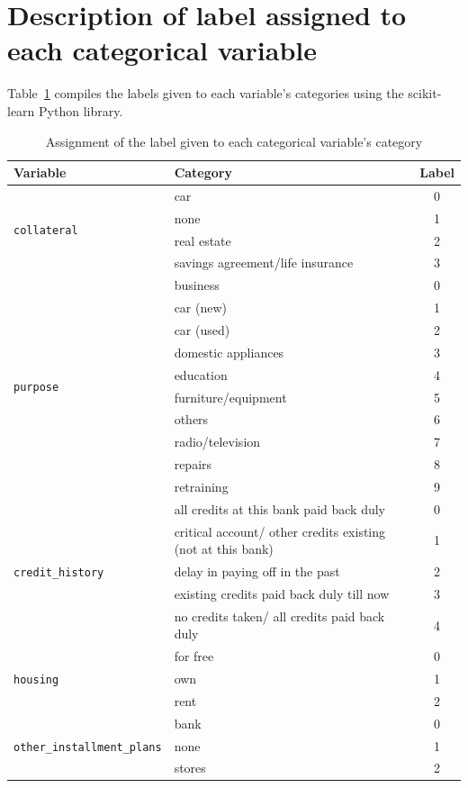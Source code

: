 \documentclass{ieeeaccess}
\begin{document}
\section{Description of label assigned to each categorical variable}
\label{ap:label_categorical}

Table~\ref{tab:label_categorical} compiles the labels given to each variable's categories using the scikit-learn Python library.

\begin{table}[!t]
  \caption{Assignment of the label given to each categorical variable's category}
  \label{tab:label_categorical}
  \centering
  \begin{tabular}{llc}
    \toprule
    Variable & Category & Label \\
    \midrule
    \multirow{4}{*}{\texttt{collateral}}
    & car & 0 \\
    & none & 1 \\
    & real estate & 2 \\
    & savings agreement/life insurance & 3 \\
    \midrule
    \multirow{10}{*}{\texttt{purpose}}
    & business & 0 \\
    & car (new) & 1 \\
    & car (used) & 2 \\
    & domestic appliances & 3 \\
    & education & 4 \\
    & furniture/equipment & 5 \\
    & others & 6 \\
    & radio/television & 7 \\
    & repairs & 8 \\
    & retraining & 9 \\
    \midrule
    \multirow{5}{*}{\texttt{credit\_history}}
    & all credits at this bank paid back duly & 0 \\
    & critical account/ other credits existing (not at this bank) & 1 \\
    & delay in paying off in the past & 2 \\
    & existing credits paid back duly till now & 3 \\
    & no credits taken/ all credits paid back duly & 4 \\
    \midrule
    \multirow{3}{*}{\texttt{housing}}
    & for free & 0 \\
    & own & 1 \\
    & rent & 2 \\
    \midrule
    \multirow{3}{*}{\texttt{other\_installment\_plans}}
    & bank & 0 \\
    & none & 1 \\
    & stores & 2 \\
    \bottomrule
  \end{tabular}
\end{table}
\end{document}
